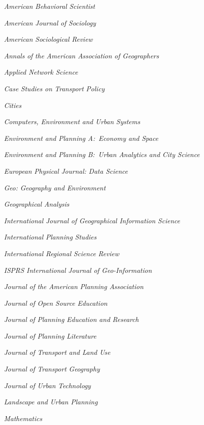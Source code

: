 \documentclass[12pt,letterpaper]{report}
\newcommand{\listitemspace}{0.25em}
\renewenvironment{itemize}
{\begin{list}{}{\setlength{\leftmargin}{0em}
                \setlength{\parskip}{0em}
                \setlength{\itemsep}{\listitemspace}
                \setlength{\parsep}{\listitemspace}}}
{\end{list}}
\begin{document}
    \begin{itemize}

        \item \textit{American Behavioral Scientist}
        \item \textit{American Journal of Sociology}
        \item \textit{American Sociological Review}
        \item \textit{Annals of the American Association of Geographers}
        \item \textit{Applied Network Science}
        \item \textit{Case Studies on Transport Policy}
        \item \textit{Cities}
        \item \textit{Computers, Environment and Urban Systems}
        \item \textit{Environment and Planning A:\ Economy and Space}
        \item \textit{Environment and Planning B:\ Urban Analytics and City Science}
        \item \textit{European Physical Journal: Data Science}
        \item \textit{Geo: Geography and Environment}
        \item \textit{Geographical Analysis}
        \item \textit{International Journal of Geographical Information Science}
        \item \textit{International Planning Studies}
        \item \textit{International Regional Science Review}
        \item \textit{ISPRS International Journal of Geo-Information}
        \item \textit{Journal of the American Planning Association}
        \item \textit{Journal of Open Source Education}
        \item \textit{Journal of Planning Education and Research}
        \item \textit{Journal of Planning Literature}
        \item \textit{Journal of Transport and Land Use}
        \item \textit{Journal of Transport Geography}
        \item \textit{Journal of Urban Technology}
        \item \textit{Landscape and Urban Planning}
        \item \textit{Mathematics}

\end{itemize}
\end{document}
